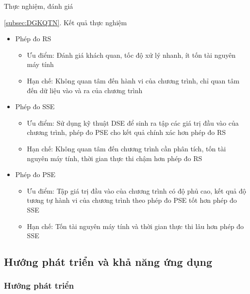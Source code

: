 \begin{frame}{Thực nghiệm, đánh giá}
\begin{block}{\ref{subsec:DGKQTN}. Kết quả thực nghiệm}
\begin{itemize}
	\item Phép đo RS
	\begin{itemize}
		\item Ưu điểm: Đánh giá khách quan, tốc độ xử lý nhanh, 
		ít tốn tài nguyên máy tính
		\item Hạn chế: Không quan tâm đến hành vi của chương 
		trình, chỉ quan tâm đến dữ liệu vào và ra của chương trình
	\end{itemize} \pause
	\item Phép đo SSE
	\begin{itemize}
		\item Ưu điểm: Sử dụng kỹ thuật DSE để sinh ra tập các 
		giá trị đầu vào của chương trình, phép đo PSE cho kết quả 
		chính xác hơn phép đo RS
		\item Hạn chế: Không quan tâm đến chương trình cần phân tích, 
		tốn tài nguyên máy tính, thời gian thực thi chậm hơn phép đo RS
	\end{itemize} \pause
	\item Phép đo PSE
	\begin{itemize}
		\item Ưu điểm: Tập giá trị đầu vào của chương trình có độ phủ cao, 
		kết quả độ tương tự hành vi của chương trình theo phép đo PSE tốt hơn phép đo SSE
		\item Hạn chế: Tốn tài nguyên máy tính và thời 
		gian thực thi lâu hơn phép đo SSE
	\end{itemize}
\end{itemize}
\end{block}
\end{frame}

\subsection{Hướng phát triển và khả năng ứng dụng}
\label{subsec:HPTKNUD}
\subsubsection*{Hướng phát triển}
\label{subsubsec:HPT}
